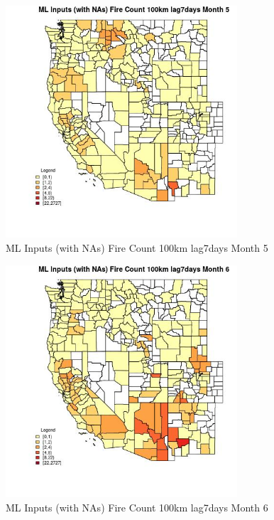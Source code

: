 \begin{figure} 
\centering  
\includegraphics[width=0.77\textwidth]{Code_Outputs/Report_ML_input_PM25_Step4_part_f_de_duplicated_aveswNAs_CountyFire_Count_100km_lag7daysmedianMonth5.jpg} 
\caption{\label{fig:Report_ML_input_PM25_Step4_part_f_de_duplicated_aveswNAsCountyFire_Count_100km_lag7daysmedianMonth5}ML Inputs (with NAs) Fire Count 100km lag7days Month 5} 
\end{figure} 
 

\begin{figure} 
\centering  
\includegraphics[width=0.77\textwidth]{Code_Outputs/Report_ML_input_PM25_Step4_part_f_de_duplicated_aveswNAs_CountyFire_Count_100km_lag7daysmedianMonth6.jpg} 
\caption{\label{fig:Report_ML_input_PM25_Step4_part_f_de_duplicated_aveswNAsCountyFire_Count_100km_lag7daysmedianMonth6}ML Inputs (with NAs) Fire Count 100km lag7days Month 6} 
\end{figure} 
 

